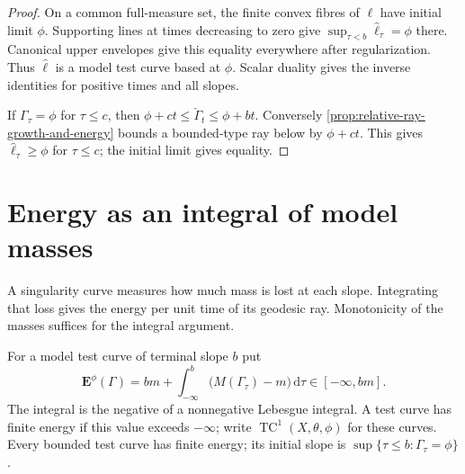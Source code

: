 \begin{proof}
On a common full-measure set, the finite convex fibres of $\ell$ have initial limit $\phi$. Supporting lines at times decreasing to zero give
$\sup_{\tau<b}\widehat\ell_\tau=\phi$ there. Canonical upper envelopes give this equality everywhere after regularization. Thus $\widehat\ell$ is a model test curve based at $\phi$. Scalar duality gives the inverse identities for positive times and all slopes.

If $\Gamma_\tau=\phi$ for $\tau\leq c$, then $\phi+ct\leq\check\Gamma_t\leq\phi+bt$. Conversely \cref{prop:relative-ray-growth-and-energy} bounds a bounded-type ray below by $\phi+ct$. This gives $\widehat\ell_\tau\geq\phi$ for $\tau\leq c$; the initial limit gives equality.
\end{proof}

\section{Energy as an integral of model masses}
\label{sec:test-curve-energy}
A singularity curve measures how much mass is lost at each slope. Integrating that loss gives the energy per unit time of its geodesic ray. Monotonicity of the masses suffices for the integral argument.

\begin{definition}\label{def:test-curve-finite-energy}
For a model test curve of terminal slope $b$ put
\[
 \mathbf E^\phi(\Gamma)
       =bm+\int_{-\infty}^b\bigl(M(\Gamma_\tau)-m\bigr)\,\mathrm d\tau
                                      \in[-\infty,bm].
\]
The integral is the negative of a nonnegative Lebesgue integral. A test curve has finite energy if this value exceeds $-\infty$; write $\operatorname{TC}^1(X,\theta,\phi)$ for these curves. Every bounded test curve has finite energy; its initial slope is $\sup\{\tau\leq b:\Gamma_\tau=\phi\}$.
\end{definition}

